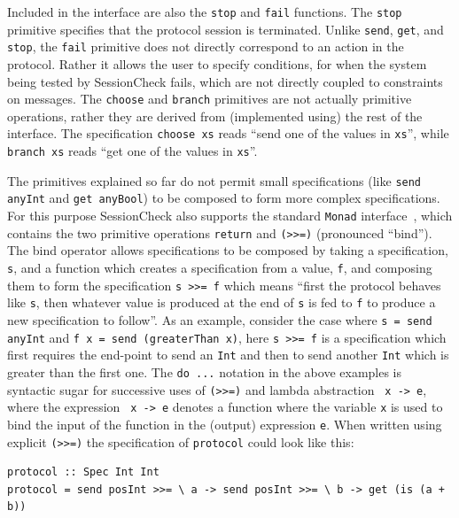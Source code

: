 \documentclass{article}
\begin{document}
Included in the interface are also the \texttt{stop} and \texttt{fail} functions.
%
The \texttt{stop} primitive specifies that the protocol session is terminated.
Unlike \texttt{send}, \texttt{get}, and \texttt{stop}, the \texttt{fail} primitive does not directly correspond to an action in the protocol.
%
Rather it allows the user to specify conditions, for when the system being tested by SessionCheck fails,
which are not directly coupled to constraints on messages.
%
The \texttt{choose} and \texttt{branch} primitives are not actually
primitive operations, rather they are derived from (implemented using)
the rest of the interface.
%
The specification \texttt{choose xs} reads ``send one of the values in \texttt{xs}'', while \texttt{branch xs} reads ``get one
of the values in \texttt{xs}''.

The primitives explained so far do not permit small specifications
(like \texttt{send anyInt} and \texttt{get anyBool}) to be composed to
form more complex specifications.
%
For this purpose SessionCheck also supports the standard \texttt{Monad} interface~\cite{WadlerMonad}, which contains the
two primitive operations \texttt{return} and \texttt{(>>=)} (pronounced ``bind'').
%
The bind operator allows specifications to be composed by taking a specification, \texttt{s}, and a function which
creates a specification from a value, \texttt{f}, and composing them to form the specification \texttt{s >>= f} which means
``first the protocol behaves like \texttt{s}, then whatever value is produced at the end of \texttt{s} is fed to \texttt{f} to produce
a new specification to follow''.
%
As an example, consider the case where \texttt{s = send anyInt} and \texttt{f x = send (greaterThan x)}, here \texttt{s >>= f} is
a specification which first requires the end-point to send an \texttt{Int} and then to send another \texttt{Int} which is greater
than the first one.
%
The \texttt{do ...} notation in the above examples is syntactic sugar for successive uses of \texttt{(>>=)} and lambda abstraction
\texttt{\ x -> e}, where the expression \texttt{\ x -> e} denotes a function where the variable \texttt{x} is used to bind the input of
the function in the (output) expression \texttt{e}.
%
When written using explicit \texttt{(>>=)} the specification of \texttt{protocol} could look like this:
%
\begin{verbatim}
protocol :: Spec Int Int
protocol = send posInt >>= \ a -> send posInt >>= \ b -> get (is (a + b))
\end{verbatim}
\end{document}

